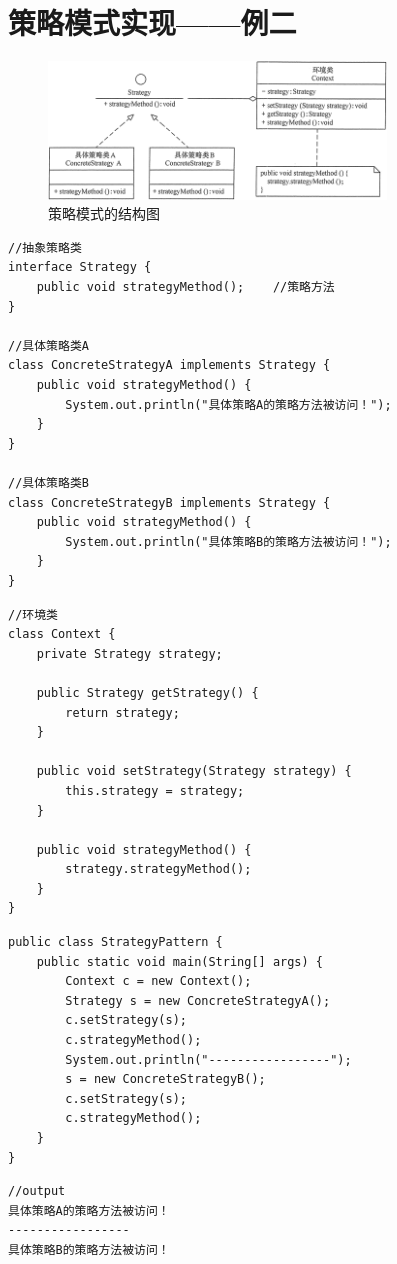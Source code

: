 \section{策略模式实现——例二}
\begin{figure}[!h]
	\centering
	\includegraphics[width=0.8\textwidth]{image/10-1}
	\caption{策略模式的结构图}
\end{figure}
\begin{lstlisting}
//抽象策略类
interface Strategy {
	public void strategyMethod();    //策略方法
}

//具体策略类A
class ConcreteStrategyA implements Strategy {
	public void strategyMethod() {
		System.out.println("具体策略A的策略方法被访问！");
	}
}

//具体策略类B
class ConcreteStrategyB implements Strategy {
	public void strategyMethod() {
		System.out.println("具体策略B的策略方法被访问！");
	}
}
\end{lstlisting}
\begin{lstlisting}
//环境类
class Context {
	private Strategy strategy;
	
	public Strategy getStrategy() {
		return strategy;
	}
	
	public void setStrategy(Strategy strategy) {
		this.strategy = strategy;
	}
	
	public void strategyMethod() {
		strategy.strategyMethod();
	}
}
\end{lstlisting}
\begin{lstlisting}
public class StrategyPattern {
	public static void main(String[] args) {
		Context c = new Context();
		Strategy s = new ConcreteStrategyA();
		c.setStrategy(s);
		c.strategyMethod();
		System.out.println("-----------------");
		s = new ConcreteStrategyB();
		c.setStrategy(s);
		c.strategyMethod();
	}
}
\end{lstlisting}
\begin{lstlisting}
//output
具体策略A的策略方法被访问！
-----------------
具体策略B的策略方法被访问！
\end{lstlisting}
